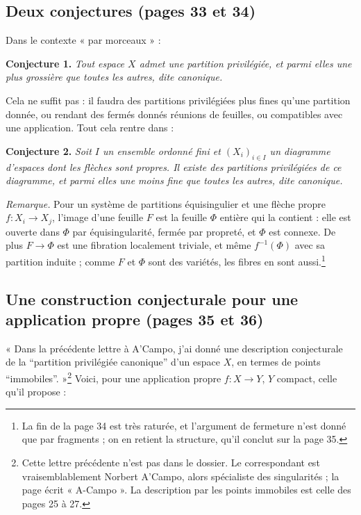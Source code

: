 \documentclass[11pt,a4paper]{article}
\begin{document}
\subsection*{Deux conjectures (pages 33 et 34)}

Dans le contexte « par morceaux » :

\textbf{Conjecture 1.} \emph{Tout espace $X$ admet une partition privilégiée, et
parmi elles une plus grossière que toutes les autres, dite canonique.}

Cela ne suffit pas : il faudra des partitions privilégiées plus fines qu'une
partition donnée, ou rendant des fermés donnés réunions de feuilles, ou
compatibles avec une application. Tout cela rentre dans :

\textbf{Conjecture 2.} \emph{Soit $I$ un ensemble ordonné fini et
$(X_i)_{i \in I}$ un diagramme d'espaces dont les flèches sont propres. Il
existe des partitions privilégiées de ce diagramme, et parmi elles une moins
fine que toutes les autres, dite canonique.}

\emph{Remarque.} Pour un système de partitions équisingulier et une flèche
propre $f : X_i \to X_j$, l'image d'une feuille $F$ est la feuille $\Phi$
entière qui la contient : elle est ouverte dans $\Phi$ par équisingularité,
fermée par propreté, et $\Phi$ est connexe. De plus $F \to \Phi$ est une
fibration localement triviale, et même $f^{-1}(\Phi)$ avec sa partition
induite ; comme $F$ et $\Phi$ sont des variétés, les fibres en sont
aussi.\footnote{La fin de la page 34 est très raturée, et l'argument de
fermeture n'est donné que par fragments ; on en retient la structure, qu'il
conclut sur la page 35.}

\subsection*{Une construction conjecturale pour une application propre (pages 35 et 36)}

« Dans la précédente lettre à A'Campo, j'ai donné une description
conjecturale de la “partition privilégiée canonique” d'un espace $X$, en
termes de points “immobiles”. »\footnote{Cette lettre précédente n'est pas
dans le dossier. Le correspondant est vraisemblablement Norbert A'Campo, alors
spécialiste des singularités ; la page écrit « A-Campo ». La description par les
points immobiles est celle des pages 25 à 27.} Voici, pour une application
propre $f : X \to Y$, $Y$ compact, celle qu'il propose :
\end{document}
